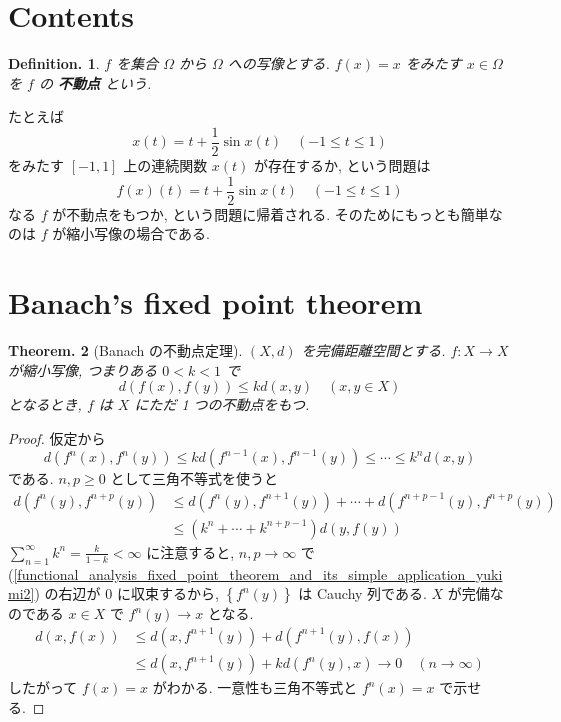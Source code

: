 \documentclass[openany, a4paper, oneside]{jsbook}
\theoremstyle{break}
\theoremstyle{breakdefn}
\newtheorem{thm}{Theorem.}[section]
\newtheorem{defn}[thm]{Definition.}
\newcommand{\rbk}[1]{\left (#1\right)}
\newcommand{\cbk}[1]{\left\{#1\right\}}
\begin{document}
\section{Contents}


\begin{defn}
 $f$ を集合 $\Omega$ から $\Omega$ への写像とする.
 $f (x)=x$ をみたす $x \in \Omega$ を $f$ の \textbf{不動点} という.
\end{defn}

たとえば
\begin{equation}
 x (t)
 =
 t + \frac{1}{2} \sin x (t) \quad (-1 \le t \le 1)
\end{equation}
をみたす $[-1, 1]$ 上の連続関数  $x (t)$  が存在するか, という問題は
\begin{equation}
 f (x) (t)
 =
 t + \frac{1}{2} \sin x (t) \quad  (-1 \le t \le 1)
\end{equation}
なる $f$ が不動点をもつか, という問題に帰着される.
そのためにもっとも簡単なのは $f$ が縮小写像の場合である.
\section{Banach's fixed point theorem}


\begin{thm}[Banach の不動点定理]
 $(X, d)$ を完備距離空間とする.
 $f \colon X \to X$ が縮小写像, つまりある $0 < k <1$ で
 \begin{equation}
  d (f (x), f (y))
  \le
  kd (x, y) \quad  (x, y \in X)
 \end{equation}
 となるとき, $f$ は $X$ にただ 1 つの不動点をもつ.
\end{thm}
\begin{proof}
仮定から
\begin{equation}
 d (f^n (x), f^n (y))
 \le
 kd \rbk{f^{n-1}(x), f^{n-1}(y)}
 \le
 \cdots
 \le
 k^nd (x, y)
\end{equation}
である.
$n, p \ge 0$ として三角不等式を使うと
\begin{align}\label{functional_analysis_fixed_point_theorem_and_its_simple_application_yukimi2}
 d (f^n (y), f^{n+p}(y))
 &\le d (f^n (y), f^{n+1}(y)) + \cdots
  +d (f^{n+p-1}(y), f^{n+p}(y))  \\
 &\le
 \rbk{k^n + \cdots + k^{n+p-1}} d (y, f (y))
\end{align}
$\sum_{n=1}^{\infty} k^n = \frac{k}{1-k} < \infty$ に注意すると,
$n, p \to \infty$ で (\ref{functional_analysis_fixed_point_theorem_and_its_simple_application_yukimi2}) の右辺が $0$ に収束するから,
$\cbk{f^n (y)}$ は Cauchy 列である.
$X$ が完備なのである $x \in X$ で $f^n (y) \to x$ となる.
\begin{align}
 d(x, f (x))
 &\le
 d (x, f^{n+1}(y)) + d (f^{n+1}(y), f (x))  \\
 &\le
 d (x, f^{n+1}(y)) + kd (f^n (y), x) \to 0 \quad \rbk{n \to \infty}
\end{align}
したがって $f (x) = x$ がわかる.
一意性も三角不等式と $f^n (x) = x$ で示せる.
\end{proof}
\end{document}
